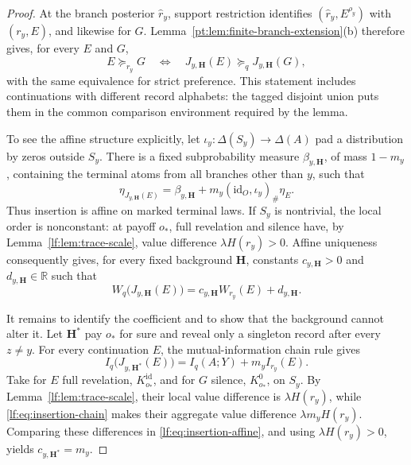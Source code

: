 \documentclass[11pt,a4paper]{article}
\theoremstyle{definition}
\newcommand{\D}{\Delta}
\newcommand{\Sh}{H}
\newcommand{\R}{\mathbb R}
\newcommand{\1}{\mathbf 1}
\begin{document}
\begin{proof}
At the branch posterior $\widehat r_y$, support restriction identifies
$(\widehat r_y,E^{\rho_y})$ with $(r_y,E)$, and likewise for $G$.
Lemma~\ref{pt:lem:finite-branch-extension}\textup{(b)} therefore gives, for every $E$ and $G$,
\[
E\succeq_{r_y}G
\quad\Longleftrightarrow\quad
J_{y,\mathbf H}(E)\succeq_qJ_{y,\mathbf H}(G),
\]
with the same equivalence for strict preference.  This statement includes
continuations with different record alphabets: the tagged disjoint union puts
them in the common comparison environment required by the lemma.

To see the affine structure explicitly, let
$\iota_y:\D(S_y)\to\D(A)$ pad a distribution by zeros outside $S_y$.
There is a fixed subprobability measure $\beta_{y,\mathbf H}$, of mass
$1-m_y$, containing the terminal atoms from all branches other than $y$, such
that
\[
\eta_{J_{y,\mathbf H}(E)}
=\beta_{y,\mathbf H}
 +m_y(\mathrm{id}_O,\iota_y)_\#\eta_E.
\]
Thus insertion is affine on marked terminal laws.  If $S_y$ is nontrivial,
the local order is nonconstant: at payoff $o_\ast$, full revelation and
silence have, by Lemma~\ref{lf:lem:trace-scale}, value difference
$\lambda\Sh(r_y)>0$.  Affine
uniqueness consequently gives, for every fixed background $\mathbf H$,
constants $c_{y,\mathbf H}>0$ and $d_{y,\mathbf H}\in\R$ such that
\begin{equation}
W_q\bigl(J_{y,\mathbf H}(E)\bigr)
=c_{y,\mathbf H}W_{r_y}(E)+d_{y,\mathbf H}.
\label{lf:eq:insertion-affine}
\end{equation}

It remains to identify the coefficient and to show that the background cannot
alter it.  Let $\mathbf H^\ast$ pay $o_\ast$ for sure and reveal only a
singleton record after every $z\ne y$.  For every continuation $E$, the
mutual-information chain rule gives
\begin{equation}
I_q\bigl(J_{y,\mathbf H^\ast}(E)\bigr)
=I_q(A;Y)+m_y I_{r_y}(E).
\label{lf:eq:insertion-chain}
\end{equation}
Take for $E$ full revelation, $K^{\mathrm{id}}_{o_\ast}$, and for $G$
silence, $K^0_{o_\ast}$, on $S_y$.  By
Lemma~\ref{lf:lem:trace-scale}, their local value difference is
$\lambda\Sh(r_y)$, while \eqref{lf:eq:insertion-chain} makes their aggregate
value difference $\lambda m_y\Sh(r_y)$.  Comparing these differences in
\eqref{lf:eq:insertion-affine}, and using
$\lambda\Sh(r_y)>0$, yields
$c_{y,\mathbf H^\ast}=m_y$.


\end{proof}
\end{document}
